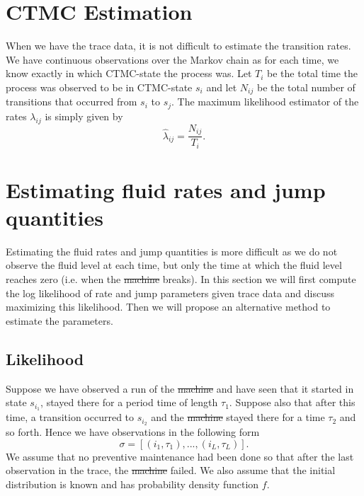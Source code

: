\documentclass[a4paper]{thesis}
\theoremstyle{definition}
\providecommand{\DIFaddtex}[1]{{\protect\color{blue}\uwave{#1}}} %
\providecommand{\DIFdeltex}[1]{{\protect\color{red}\sout{#1}}}                      %
\providecommand{\DIFaddbegin}{} %
\providecommand{\DIFaddend}{} %
\providecommand{\DIFdelbegin}{} %
\providecommand{\DIFdelend}{} %
\providecommand{\DIFadd}[1]{\texorpdfstring{\DIFaddtex{#1}}{#1}} %
\providecommand{\DIFdel}[1]{\texorpdfstring{\DIFdeltex{#1}}{}} %
\newcommand{\DIFscaledelfig}{0.5}
\newlength{\DIFdelgraphicswidth} %
\newlength{\DIFdelgraphicsheight} %
\newcommand{\DIFaddincludegraphics}[2][]{{\color{blue}\fbox{\DIFOincludegraphics[#1]{#2}}}} %
\newcommand{\DIFdelincludegraphics}[2][]{%
	\sbox{\DIFdelgraphicsbox}{\DIFOincludegraphics[#1]{#2}}%
	\settoboxwidth{\DIFdelgraphicswidth}{\DIFdelgraphicsbox} %
	\settoboxtotalheight{\DIFdelgraphicsheight}{\DIFdelgraphicsbox} %
	\scalebox{\DIFscaledelfig}{%
		\parbox[b]{\DIFdelgraphicswidth}{\usebox{\DIFdelgraphicsbox}\\[-\baselineskip] \rule{\DIFdelgraphicswidth}{0em}}\llap{\resizebox{\DIFdelgraphicswidth}{\DIFdelgraphicsheight}{%
				\setlength{\unitlength}{\DIFdelgraphicswidth}%
				\begin{picture}(1,1)%
				\thicklines\linethickness{2pt} %
				{\color[rgb]{1,0,0}\put(0,0){\framebox(1,1){}}}%
				{\color[rgb]{1,0,0}\put(0,0){\line( 1,1){1}}}%
				{\color[rgb]{1,0,0}\put(0,1){\line(1,-1){1}}}%
				\end{picture}%
			}\hspace*{3pt}}} %
} %
\DeclareRobustCommand{\DIFaddbegin}{\DIFOaddbegin \let\includegraphics\DIFaddincludegraphics} %
\DeclareRobustCommand{\DIFaddend}{\DIFOaddend \let\includegraphics\DIFOincludegraphics} %
\DeclareRobustCommand{\DIFdelbegin}{\DIFOdelbegin \let\includegraphics\DIFdelincludegraphics} %
\DeclareRobustCommand{\DIFdelend}{\DIFOaddend \let\includegraphics\DIFOincludegraphics} %
\begin{document}
	\section{CTMC Estimation}
	When we have the trace data, it is not difficult to estimate the transition rates.
	We have continuous observations over the Markov chain as for each time, we know exactly in which CTMC-state the process was.
	Let $T_i$ be the total time the process was observed to be in CTMC-state $s_i$ and let $N_{ij}$ be the total number of transitions that occurred from $s_i$ to $s_j$.
	The maximum likelihood estimator of the rates $\lambda_{ij}$ is simply given by \cite{Inamura2006}
	\[
	\hat\lambda_{ij}=\frac{N_{ij}}{T_i}.
	\]
	
	\section{Estimating fluid rates and jump quantities}
	Estimating the fluid rates and jump quantities is more difficult as we do not observe the fluid level at each time, but only the time at which the fluid level reaches zero (i.e. when the \DIFdelbegin \DIFdel{machine }\DIFdelend \DIFaddbegin \DIFadd{asset }\DIFaddend breaks).
	In this section we will first compute the log likelihood of rate and jump parameters given trace data and discuss maximizing this likelihood.
	Then we will propose an alternative method to estimate the parameters.
	
	\subsection{Likelihood}
	Suppose we have observed a run of the \DIFdelbegin \DIFdel{machine }\DIFdelend \DIFaddbegin \DIFadd{process }\DIFaddend and have seen that it started in state $s_{i_1}$, stayed there for a period time of length $\tau_1$.
	Suppose also that after this time, a transition occurred to $s_{i_2}$ and the \DIFdelbegin \DIFdel{machine }\DIFdelend \DIFaddbegin \DIFadd{process }\DIFaddend stayed there for a time $\tau_2$ and so forth.
	Hence we have observations in the following form
	$$
	\sigma=\left[(i_1,\tau_1),...,(i_L,\tau_L)\right].
	$$
	We assume that no preventive maintenance had been done so that after the last observation in the trace, the \DIFdelbegin \DIFdel{machine }\DIFdelend \DIFaddbegin \DIFadd{asset }\DIFaddend failed.
	We also assume that the initial distribution is known and has probability density function $f$.
	
\end{document}
